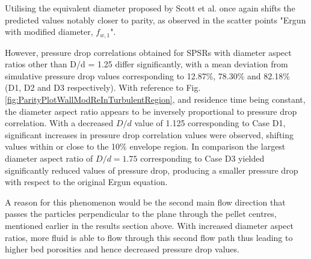 Utilising the equivalent diameter proposed by Scott et al. \cite{Scott1974} once again shifts the predicted values notably closer to parity, as observed in the scatter points "Ergun with modified diameter, $f_{w,1}$".

However, pressure drop correlations obtained for SPSRs with diameter aspect ratios other than D/d = 1.25 differ significantly, with a mean deviation from simulative pressure drop values corresponding to 12.87\%, 78.30\% and 82.18\% (D1, D2 and D3 respectively).
With reference to Fig. \ref{fig:ParityPlotWallModReInTurbulentRegion}, and residence time being constant, the diameter aspect ratio appears to be inversely proportional to pressure drop correlation. With a decreased $D/d$ value of 1.125 corresponding to Case D1, significant increases in pressure drop correlation values were observed, shifting values within or close to the 10\% envelope region. In comparison the largest diameter aspect ratio of $D/d = 1.75$ corresponding to Case D3 yielded significantly reduced values of pressure drop, producing a smaller pressure drop with respect to the original Ergun equation.

A reason for this phenomenon would be the second main flow direction that passes the particles perpendicular to the plane through the pellet centres, mentioned earlier in the results section above. With increased diameter aspect ratios, more fluid is able to flow through this second flow path thus leading to higher bed porosities and hence decreased pressure drop values.

